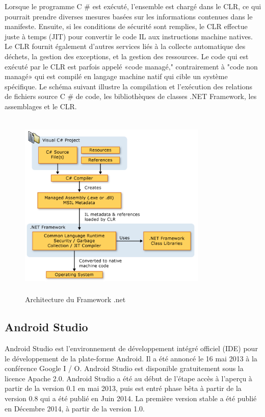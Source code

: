 \documentclass[11pt, a4paper, twoside]{book}
\begin{document}
Lorsque le programme C \# est exécuté, l'ensemble est chargé dans le CLR, ce qui pourrait prendre diverses mesures basées sur les informations contenues dans le manifeste. Ensuite, si les conditions de sécurité sont remplies, le CLR effectue juste à temps (JIT) pour convertir le code IL aux instructions machine natives. Le CLR fournit également d'autres services liés à la collecte automatique des déchets, la gestion des exceptions, et la gestion des ressources. Le code qui est exécuté par le CLR est parfois appelé «code managé," contrairement à "code non managé» qui est compilé en langage machine natif qui cible un système spécifique. Le schéma suivant illustre la compilation et l'exécution des relations de fichiers source C \# de code, les bibliothèques de classes .NET Framework, les assemblages et le CLR.
\begin{figure}[H]
\centering
\includegraphics[width=9cm,height=9cm]{net}
\caption{Architecture du Framework .net}
\end{figure}
\subsection{Android Studio}
Android Studio est l'environnement de développement intégré officiel (IDE) pour le développement de la plate-forme Android. Il a été annoncé le 16 mai 2013 à la conférence Google I / O. Android Studio est disponible gratuitement sous la licence Apache 2.0. Android Studio a été au début de l'étape accès à l'aperçu à partir de la version 0.1 en mai 2013, puis est entré phase bêta à partir de la version 0.8 qui a été publié en Juin 2014. La première version stable a été publié en Décembre 2014, à partir de la version 1.0.\\
\end{document}
